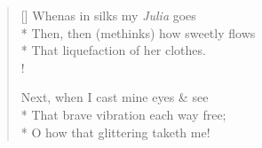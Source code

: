 \documentclass[MAIN]{subfiles}
\begin{document}
\begin{verse}[\versewidth]
Whenas in silks my \emph{Julia} goes\\*
Then, then (methinks) how sweetly flows\\*
That liquefaction of her clothes.\\!

Next, when I cast mine eyes \& see\\*
That brave vibration each way free;\\*
O how that glittering taketh me!
\end{verse}
\end{document}
